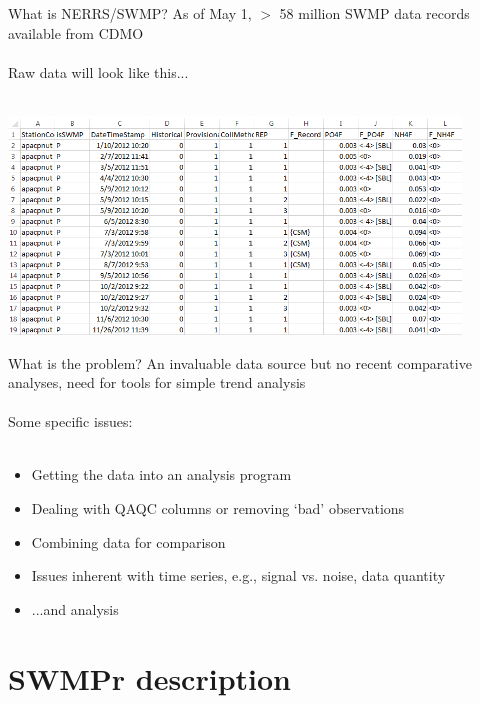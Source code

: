 \documentclass[serif]{beamer}\usepackage[]{graphicx}\usepackage[]{color}
\begin{document}
\begin{frame}[t]{What is NERRS/SWMP?}
As of May 1, $>$ 58 million SWMP data records available from CDMO\\~\\
Raw data will look like this...\\~\\
\centerline{\includegraphics[width = 0.9\textwidth]{fig/qaqc_ex.png}}
\end{frame}

\begin{frame}{What is the problem?}
An invaluable data source but no recent comparative analyses, need for tools for simple trend analysis \\~\\
Some specific issues:\\~\\
\begin{itemize}
\item Getting the data into an analysis program
\item Dealing with QAQC columns or removing `bad' observations
\item Combining data for comparison
\item Issues inherent with time series, e.g., signal vs. noise, data quantity
\item ...and analysis
\end{itemize}
\end{frame}

\section{SWMPr description}
\end{document}
